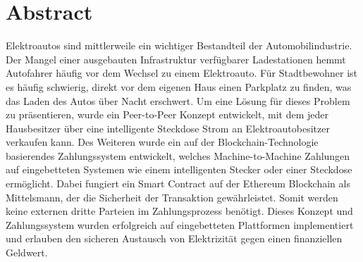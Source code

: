 \thispagestyle{empty}

\section*{Abstract}

Elektroautos sind mittlerweile ein wichtiger Bestandteil der Automobilindustrie.
Der Mangel einer ausgebauten Infrastruktur verfügbarer Ladestationen hemmt Autofahrer häufig vor dem Wechsel zu einem Elektroauto.
Für Stadtbewohner ist es häufig schwierig, direkt vor dem eigenen Haus einen Parkplatz zu finden, was das Laden des Autos über Nacht erschwert.
Um eine Lösung für dieses Problem zu präsentieren, wurde ein Peer-to-Peer Konzept entwickelt, mit dem jeder Hausbesitzer über eine intelligente Steckdose Strom an Elektroautobesitzer verkaufen kann.
Des Weiteren wurde ein auf der Blockchain-Technologie basierendes Zahlungssystem entwickelt, welches Machine-to-Machine Zahlungen auf eingebetteten Systemen wie einem intelligenten Stecker oder einer Steckdose ermöglicht.
Dabei fungiert ein Smart Contract auf der Ethereum Blockchain als Mittelsmann, der die Sicherheit der Transaktion gewährleistet.
Somit werden keine externen dritte Parteien im Zahlungsprozess benötigt.
Dieses Konzept und Zahlungssystem wurden erfolgreich auf eingebetteten Plattformen implementiert und erlauben den sicheren Austausch von Elektrizität gegen einen finanziellen Geldwert.